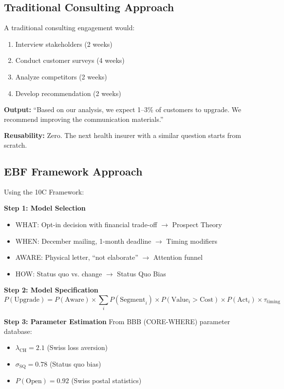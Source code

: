 \subsection{Traditional Consulting Approach}

A traditional consulting engagement would:
\begin{enumerate}
    \item Interview stakeholders (2 weeks)
    \item Conduct customer surveys (4 weeks)
    \item Analyze competitors (2 weeks)
    \item Develop recommendation (2 weeks)
\end{enumerate}

\textbf{Output:} ``Based on our analysis, we expect 1--3\% of customers to upgrade. We recommend improving the communication materials.''

\textbf{Reusability:} Zero. The next health insurer with a similar question starts from scratch.

\subsection{EBF Framework Approach}

Using the 10C Framework:

\textbf{Step 1: Model Selection}
\begin{itemize}[nosep]
    \item WHAT: Opt-in decision with financial trade-off $\to$ Prospect Theory
    \item WHEN: December mailing, 1-month deadline $\to$ Timing modifiers
    \item AWARE: Physical letter, ``not elaborate'' $\to$ Attention funnel
    \item HOW: Status quo vs. change $\to$ Status Quo Bias
\end{itemize}

\textbf{Step 2: Model Specification}
\begin{equation}
P(\text{Upgrade}) = P(\text{Aware}) \times \sum_i P(\text{Segment}_i) \times P(\text{Value}_i > \text{Cost}) \times P(\text{Act}_i) \times \tau_{\text{timing}}
\end{equation}

\textbf{Step 3: Parameter Estimation}
From BBB (CORE-WHERE) parameter database:
\begin{itemize}[nosep]
    \item $\lambda_{\text{CH}} = 2.1$ (Swiss loss aversion)
    \item $\sigma_{\text{SQ}} = 0.78$ (Status quo bias)
    \item $P(\text{Open}) = 0.92$ (Swiss postal statistics)
\end{itemize}


